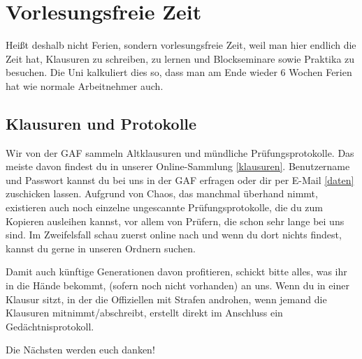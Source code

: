 ﻿\chapter{Vorlesungsfreie Zeit}

Heißt deshalb nicht Ferien, sondern vorlesungsfreie Zeit, weil man hier endlich die Zeit hat, Klausuren zu schreiben, zu lernen und Blockseminare sowie Praktika zu besuchen. Die Uni kalkuliert dies so, dass man am Ende wieder 6 Wochen Ferien hat wie normale Arbeitnehmer auch.

\section{Klausuren und Protokolle}
Wir von der GAF sammeln Altklausuren und mündliche Prüfungsprotokolle. Das meiste davon findest du in unserer Online-Sammlung \ref{klausuren}. Benutzername und Passwort kannst du bei uns in der GAF erfragen oder dir per E-Mail \ref{daten} zuschicken lassen.
Aufgrund von Chaos, das manchmal überhand nimmt, existieren auch noch einzelne ungescannte Prüfungsprotokolle, die du zum Kopieren ausleihen kannst, vor allem von Prüfern, die schon sehr lange bei uns sind. Im Zweifelsfall schau zuerst online nach und wenn du dort nichts findest, kannst du gerne in unseren Ordnern suchen.

Damit auch künftige Generationen davon profitieren, schickt bitte alles,
was ihr in die Hände bekommt, (sofern noch nicht vorhanden) an uns.
Wenn du in einer Klausur sitzt, in der die Offiziellen mit Strafen
androhen, wenn jemand die Klausuren mitnimmt/abschreibt, erstellt
direkt im Anschluss ein Gedächtnisprotokoll.

Die Nächsten werden euch danken!

\begin{urlList}
\end{urlList}

